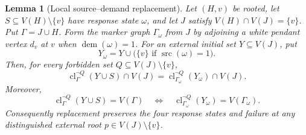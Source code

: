 \documentclass[11pt,reqno]{amsart}
\newtheorem{lemma}[lemma]{Lemma}
\theoremstyle{definition}
\newcommand{\cl}{\operatorname{cl}}
\begin{document}
\begin{lemma}[Local source--demand replacement]\label{lem:replacement}
Let $(H,v)$ be rooted, let $S\subseteq V(H)\setminus\{v\}$ have response state
$\omega$, and let $J$ satisfy $V(H)\cap V(J)=\{v\}$.  Put
$\Gamma=J\cup H$.  Form the marker graph $\Gamma_\omega$ from $J$ by adjoining
a white pendant vertex $d_v$ at $v$ when $\operatorname{dem}(\omega)=1$.
For an external initial set $Y\subseteq V(J)$, put
\[
  Y_\omega=Y\cup
  \bigl(\{v\}\text{ if }\operatorname{src}(\omega)=1\bigr).
\]
Then, for every forbidden set $Q\subseteq V(J)\setminus\{v\}$,
\begin{equation}\label{eq:replacement-projection}
  \cl_{\Gamma}^{\neg Q}(Y\cup S)\cap V(J)
  =
  \cl_{\Gamma_\omega}^{\neg Q}(Y_\omega)\cap V(J).
\end{equation}
Moreover,
\begin{equation}\label{eq:replacement-completion}
  \cl_{\Gamma}^{\neg Q}(Y\cup S)=V(\Gamma)
  \quad\Longleftrightarrow\quad
  \cl_{\Gamma_\omega}^{\neg Q}(Y_\omega)=V(\Gamma_\omega).
\end{equation}
Consequently replacement preserves the four response states and failure at
any distinguished external root $p\in V(J)\setminus\{v\}$.
\end{lemma}
\end{document}
